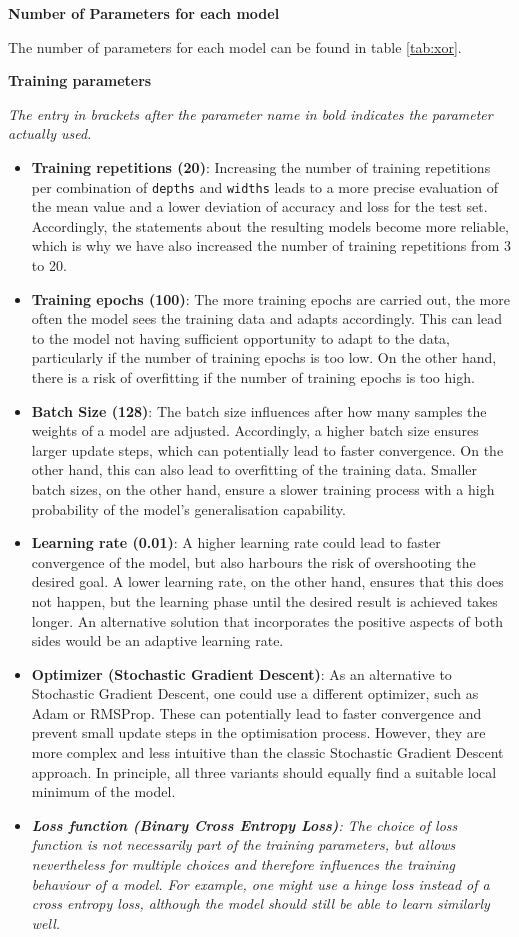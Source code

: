\textbf{Number of Parameters for each model}

The number of parameters for each model can be found in table \ref{tab:xor}. 

\textbf{Training parameters}

\textit{
The entry in brackets after the parameter name in bold indicates the parameter actually used.}

\begin{itemize}
    \item \textbf{Training repetitions (20)}: Increasing the number of training repetitions per combination of \lstinline|depths| and \lstinline|widths| leads to a more precise evaluation of the mean value and a lower deviation of accuracy and loss for the test set. Accordingly, the statements about the resulting models become more reliable, which is why we have also increased the number of training repetitions from 3 to 20.
    \item \textbf{Training epochs (100)}: The more training epochs are carried out, the more often the model sees the training data and adapts accordingly. This can lead to the model not having sufficient opportunity to adapt to the data, particularly if the number of training epochs is too low. On the other hand, there is a risk of overfitting if the number of training epochs is too high.
    \item \textbf{Batch Size (128)}: The batch size influences after how many samples the weights of a model are adjusted. Accordingly, a higher batch size ensures larger update steps, which can potentially lead to faster convergence. On the other hand, this can also lead to overfitting of the training data. Smaller batch sizes, on the other hand, ensure a slower training process with a high probability of the model's generalisation capability.
    \item \textbf{Learning rate (0.01)}: A higher learning rate could lead to faster convergence of the model, but also harbours the risk of overshooting the desired goal. A lower learning rate, on the other hand, ensures that this does not happen, but the learning phase until the desired result is achieved takes longer. An alternative solution that incorporates the positive aspects of both sides would be an adaptive learning rate.
    \item \textbf{Optimizer (Stochastic Gradient Descent)}: As an alternative to Stochastic Gradient Descent, one could use a different optimizer, such as Adam or RMSProp. These can potentially lead to faster convergence and prevent small update steps in the optimisation process. However, they are more complex and less intuitive than the classic Stochastic Gradient Descent approach. In principle, all three variants should equally find a suitable local minimum of the model.
    \item \textit{\textbf{Loss function (Binary Cross Entropy Loss)}: The choice of loss function is not necessarily part of the training parameters, but allows nevertheless for multiple choices and therefore influences the training behaviour of a model. For example, one might use a hinge loss instead of a cross entropy loss, although the model should still be able to learn similarly well.}
    \end{itemize}

    \clearpage
    
